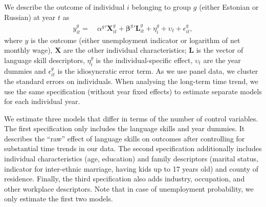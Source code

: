 \documentclass[12pt, a4paper]{article}
\renewcommand*{\vec}[1]{\boldsymbol{#1}}
\begin{document}
We describe the outcome of individual $i$ belonging to group $g$ (either Estonian
or Russian) at year $t$ as
\begin{equation}
	\label{eq:specification}
	\begin{split}
		y_{it} ^{g} = &\: \alpha^{g}{}' \vec{X}_{it}^{g} + \vec{\beta}^{g}{}' \vec{L}_{it}^{g} +
		\eta_{i}^{g} +
		\upsilon_{t} + \epsilon_{it}^{g},
	\end{split}
\end{equation}
where $y$ is the outcome (either unemployment indicator
or logarithm of net monthly wage), $\vec{X}$ are the other individual
characteristics; $\vec{L}$ is the vector of
language skill descriptors, $\eta_{i}^{g}$ is the individual-specific effect, $\upsilon_{t}$ are the year dummies and $\epsilon_{it}^{g}$
is the idiosyncratic error term. 
As we use panel data, we cluster the
standard errors on individuals.  When analysing the long-term time
trend, we use the same specification (without year fixed effects) to
estimate separate models for each individual year.

We estimate three models that differ in terms of the number of
control variables. The first specification only includes the language skills
and year dummies.  It describes the ``raw'' effect of language skills
on outcomes after controlling for substantial time trends in our data.
The second specification additionally includes individual
characteristics (age, education) and family descriptors (marital
status, indicator for inter-ethnic marriage, having kids up to 17 years
old) and county of residence.  
Finally, the third specification also adds industry, occupation, and other
workplace descriptors.
Note that in case of unemployment probability,
we only estimate the first two models.
\end{document}
